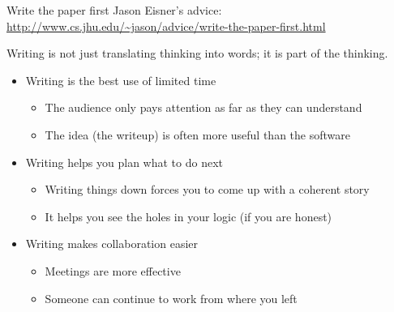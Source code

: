 \documentclass[usenames,dvipsnames,11pt,aspectratio=169]{beamer}
\begin{document}
\begin{frame}
    {Write the paper first}
    Jason Eisner's advice: \url{http://www.cs.jhu.edu/~jason/advice/write-the-paper-first.html}

    Writing is not just translating thinking into words; it is part of the thinking.
    \begin{itemize}
        \item Writing is the best use of limited time
            \begin{itemize}
                \item The audience only pays attention as far as they can understand
                \item The idea (the writeup) is often more useful than the software
            \end{itemize}
        \pause
        \item Writing helps you plan what to do next 
            \begin{itemize}
                \item Writing things down forces you to come up with a coherent story 
                \item It helps you see the holes in your logic (if you are honest)  
            \end{itemize}
        \pause
        \item Writing makes collaboration easier
            \begin{itemize}
                \item Meetings are more effective
                \item Someone can continue to work from where you left 
            \end{itemize}
    \end{itemize}
\end{frame}
\end{document}
